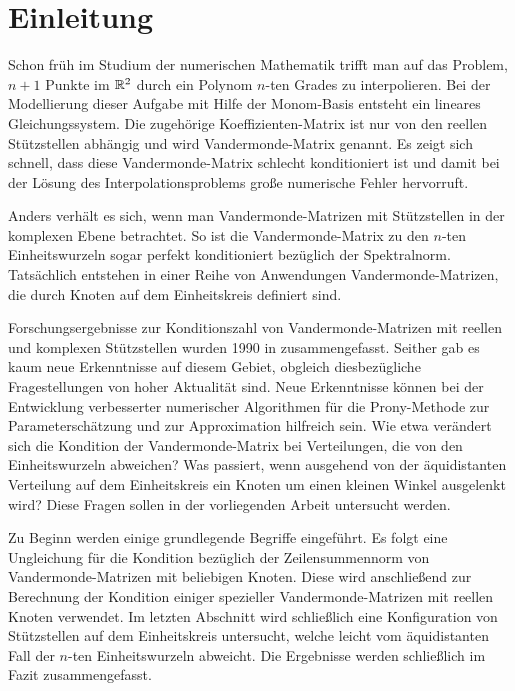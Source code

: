 \chapter{Einleitung}


Schon früh im Studium der numerischen Mathematik trifft man auf das Problem,
$n+1$ Punkte im $\mathbb{R}^2$ durch ein Polynom $n$-ten Grades zu interpolieren.  Bei
der Modellierung dieser Aufgabe mit Hilfe der Monom-Basis entsteht ein lineares
Gleichungssystem.  Die zugehörige Koeffizienten-Matrix ist nur von den reellen
Stützstellen abhängig und wird Vandermonde-Matrix genannt.  Es zeigt sich
schnell, dass diese Vandermonde-Matrix schlecht konditioniert ist und damit bei
der Lösung des Interpolationsproblems große numerische Fehler hervorruft.

Anders verhält es sich, wenn man Vandermonde-Matrizen mit Stützstellen in der
komplexen Ebene betrachtet.  So ist die Vandermonde-Matrix zu den $n$-ten
Einheitswurzeln sogar perfekt konditioniert bezüglich der Spektralnorm.
Tatsächlich entstehen in einer Reihe von Anwendungen Vandermonde-Matrizen, die
durch Knoten auf dem Einheitskreis definiert sind.

Forschungsergebnisse zur Konditionszahl von Vandermonde-Matrizen mit reellen
und komplexen Stützstellen wurden 1990 in \cite{gautschi1} zusammengefasst.
Seither gab es kaum neue Erkenntnisse auf diesem Gebiet, obgleich
diesbezügliche Fragestellungen von hoher Aktualität sind.
Neue Erkenntnisse können bei der Entwicklung verbesserter numerischer
Algorithmen für die Prony-Methode zur Parameterschätzung und zur Approximation
hilfreich sein.
Wie etwa verändert sich die Kondition der Vandermonde-Matrix bei Verteilungen,
die von den Einheitswurzeln abweichen?  Was passiert, wenn ausgehend von der
äquidistanten Verteilung auf dem Einheitskreis ein Knoten um einen kleinen
Winkel ausgelenkt wird?
Diese Fragen sollen in der vorliegenden Arbeit untersucht werden.

Zu Beginn werden einige grundlegende Begriffe eingeführt. Es folgt eine
Ungleichung für die Kondition bezüglich der Zeilensummennorm von
Vandermonde-Matrizen mit beliebigen Knoten.  Diese wird anschließend zur
Berechnung der Kondition einiger spezieller Vandermonde-Matrizen mit reellen
Knoten verwendet.  Im letzten Abschnitt wird schließlich eine Konfiguration von
Stützstellen auf dem Einheitskreis untersucht, welche leicht vom äquidistanten
Fall der $n$-ten Einheitswurzeln abweicht. Die Ergebnisse werden schließlich im
Fazit zusammengefasst.
